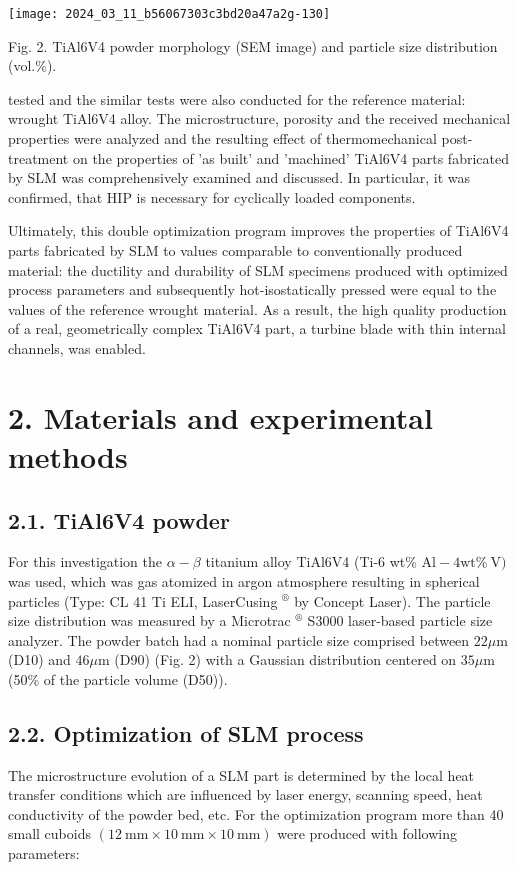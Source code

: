 \documentclass[10pt]{article}
\begin{document}
\begin{center}
\texttt{[image: 2024\_03\_11\_b56067303c3bd20a47a2g-130]}
\end{center}

Fig. 2. TiAl6V4 powder morphology (SEM image) and particle size distribution (vol.\%).

tested and the similar tests were also conducted for the reference material: wrought TiAl6V4 alloy. The microstructure, porosity and the received mechanical properties were analyzed and the resulting effect of thermomechanical post-treatment on the properties of 'as built' and 'machined' TiAl6V4 parts fabricated by SLM was comprehensively examined and discussed. In particular, it was confirmed, that HIP is necessary for cyclically loaded components.

Ultimately, this double optimization program improves the properties of TiAl6V4 parts fabricated by SLM to values comparable to conventionally produced material: the ductility and durability of SLM specimens produced with optimized process parameters and subsequently hot-isostatically pressed were equal to the values of the reference wrought material. As a result, the high quality production of a real, geometrically complex TiAl6V4 part, a turbine blade with thin internal channels, was enabled.

\section*{2. Materials and experimental methods}
\subsection*{2.1. TiAl6V4 powder}
For this investigation the $\alpha-\beta$ titanium alloy TiAl6V4 (Ti-6 wt\% $\mathrm{Al}-4 \mathrm{wt} \% \mathrm{~V})$ was used, which was gas atomized in argon atmosphere resulting in spherical particles (Type: CL 41 Ti ELI, LaserCusing ${ }^{\circledR}$ by Concept Laser). The particle size distribution was measured by a Microtrac ${ }^{\circledR}$ S3000 laser-based particle size analyzer. The powder batch had a nominal particle size comprised between $22 \mu \mathrm{m}$ (D10) and $46 \mu \mathrm{m}$ (D90) (Fig. 2) with a Gaussian distribution centered on $35 \mu \mathrm{m}$ (50\% of the particle volume (D50)).

\subsection*{2.2. Optimization of SLM process}
The microstructure evolution of a SLM part is determined by the local heat transfer conditions which are influenced by laser energy, scanning speed, heat conductivity of the powder bed, etc. For the optimization program more than 40 small cuboids $(12 \mathrm{~mm} \times 10 \mathrm{~mm} \times 10 \mathrm{~mm})$ were produced with following parameters:
\end{document}

